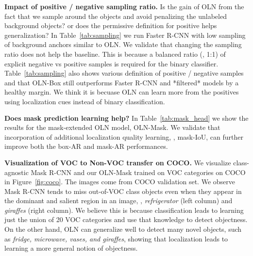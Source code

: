 \documentclass[10pt,twocolumn,letterpaper]{article}
\newcommand{\OURS}{OLN}
\newcommand{\figureref}[1]{Figure~\ref{#1}}
\newcommand{\tableref}[1]{Table~\ref{#1}}
\renewcommand{\paragraph}[1]{\vspace{1mm}\noindent\textbf{#1}}
\begin{document}
\paragraph{{Impact of positive / negative sampling ratio.}}\quad
Is the gain of \OURS{} from the fact that we sample around the objects and avoid penalizing the unlabeled background objects? or does the permissive definition for positive helps generalization? In \tableref{tab:sampling} we run Faster R-CNN with low sampling of background anchors similar to OLN. We validate that changing the sampling ratio does not help the baseline. This is because a balanced ratio (\eg, 1:1) of explicit negative vs positive samples is required for the binary classifier. \tableref{tab:sampling} also shows various definition of positive / negative samples and that OLN-Box still outperforms Faster R-CNN and *filtered* models by a healthy margin. We think it is becuase OLN can learn more from the positives using localization cues instead of binary classification.



\paragraph{{Does mask prediction learning help?}}\quad
In \tableref{tab:mask_head} we show the results for the mask-extended OLN model, OLN-Mask. We validate that incorporation of additional localization quality learning, \ie, mask-IoU, can further improve both the box-AR and mask-AR performances.  


\paragraph{{Visualization of VOC to Non-VOC transfer on COCO.}}\quad
We visualize class-agnostic Mask R-CNN and our \OURS{}-Mask trained on VOC categories on COCO in \figureref{fig:coco}. The images come from COCO validation set. We observe Mask R-CNN tends to miss out-of-VOC class objects even when they appear in the dominant and salient region in an image, \eg, \textit{refrigerator} (left column) and \textit{giraffes} (right column). We believe this is because classification leads to learning just the union of 20 VOC categories and use that knowledge to detect objectness. On the other hand, \OURS{} can generalize well to detect many novel objects, such as \textit{fridge, microwave, vases, and giraffes}, showing that localization leads to learning a more general notion of objectness. 
\end{document}

